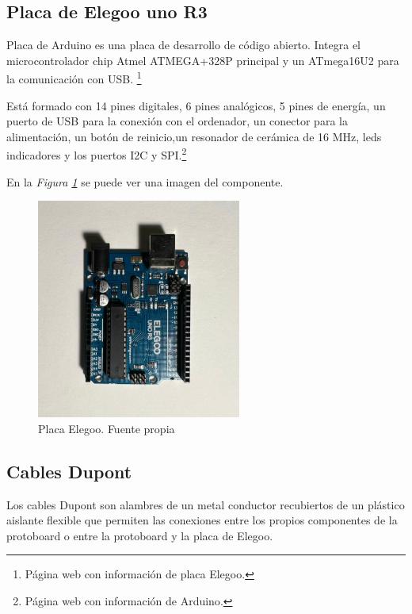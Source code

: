 \subsection{Placa de Elegoo uno R3}
Placa de Arduino es una placa de desarrollo de código abierto. 
Integra el microcontrolador chip Atmel ATMEGA+328P principal y un ATmega16U2 para la comunicación con USB. \cite{Elegoo}\footnote{Página web con información de placa Elegoo\cite{Elegoo}.}

Está formado con 14 pines digitales, 6 pines analógicos, 5 pines de energía, un puerto de USB para la conexión con el ordenador, un conector para la alimentación, un botón de reinicio,un resonador de cerámica de 16 MHz, leds indicadores y los puertos I2C y SPI.\cite{Arduino}\footnote{Página web con información de Arduino\cite{Arduino}.}

En la \textit{Figura \ref{fig:Placa Elegoo}} se puede ver una imagen del componente.
\begin{figure}[h]
        \centering
        \includegraphics[angle=90,width=0.6\textwidth]{img/placa elegoo.png}
        \caption{Placa Elegoo. Fuente propia}
        \label{fig:Placa Elegoo}
    \end{figure}

\subsection{Cables Dupont}
Los cables Dupont son alambres de un metal conductor recubiertos de un plástico aislante flexible que permiten las conexiones entre los propios componentes de la protoboard o entre la protoboard y la placa de Elegoo. 

